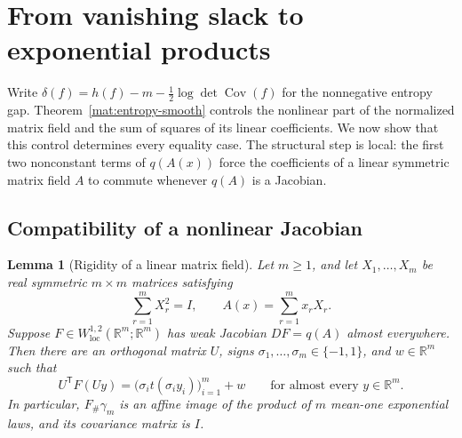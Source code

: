 \documentclass[11pt]{article}
\newtheorem{lemma}[theorem]{Lemma}
\theoremstyle{definition}
\theoremstyle{remark}
\numberwithin{equation}{section}
\begin{document}
\section{From vanishing slack to exponential products}\label{sec:rigidity}

Write $\delta(f)=h(f)-m-\tfrac12\log\det\operatorname{Cov}(f)$ for the
nonnegative entropy gap.  Theorem~\ref{mat:entropy-smooth} controls the nonlinear part of the normalized
matrix field and the sum of squares of its linear coefficients.  We now
show that this control determines every equality case.  The structural
step is local: the first two nonconstant terms of $q(A(x))$ force the
coefficients of a linear symmetric matrix field $A$ to commute whenever
$q(A)$ is a Jacobian.

\subsection{Compatibility of a nonlinear Jacobian}

\begin{lemma}[Rigidity of a linear matrix field]\label{lem:linear-jacobian}
Let $m\ge1$, and let $X_1,\ldots,X_m$ be real symmetric $m\times m$ matrices satisfying
\[
  \sum_{r=1}^m X_r^2=I,
  \qquad A(x)=\sum_{r=1}^m x_rX_r.
\]
Suppose $F\in W^{1,2}_{\mathrm{loc}}(\mathbb R^m;\mathbb R^m)$ has weak Jacobian
$DF=q(A)$ almost everywhere.  Then there are an orthogonal matrix $U$,
signs $\sigma_1,\ldots,\sigma_m\in\{-1,1\}$, and $w\in\mathbb R^m$ such that
\begin{equation}\label{eq:rigid-map}
  U^{\mathsf T}F(Uy)
  =\bigl(\sigma_i t(\sigma_i y_i)\bigr)_{i=1}^m+w
  \qquad\text{for almost every }y\in\mathbb R^m.
\end{equation}
In particular, $F_\#\gamma_m$ is an affine image of the product of $m$
mean-one exponential laws, and its covariance matrix is $I$.
\end{lemma}
\end{document}
